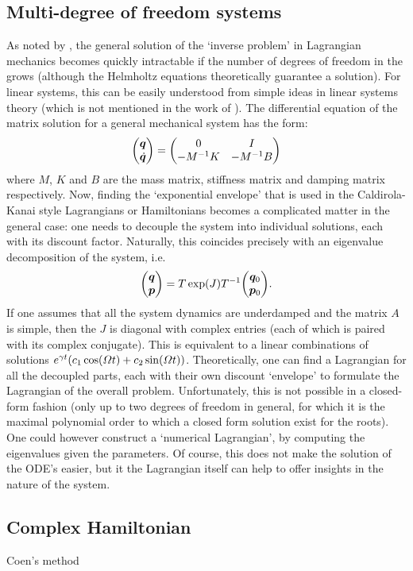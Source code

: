 \subsection{Multi-degree of freedom systems}
As noted by \citet{Udwadia2013}, the general solution of the `inverse problem' in Lagrangian mechanics becomes quickly intractable if the number of degrees of freedom in the grows (although the Helmholtz equations theoretically guarantee a solution). For linear systems, this can be easily understood from simple ideas in linear systems theory (which is not mentioned in the work of \citet{Udwadia2013}). The differential equation of the matrix solution for a general mechanical system has the form:
$$ \mqty(\vec{q}\\\vec{\dot{q}}) = \mqty(0 & I \\ -M^{-1}K & -M^{-1}B) $$
where $M$, $K$ and $B$ are the mass matrix, stiffness matrix and damping matrix respectively. Now, finding the `exponential envelope' that is used in the Caldirola-Kanai style Lagrangians or Hamiltonians becomes a complicated matter in the general case: one needs to decouple the system into individual solutions, each with its discount factor. Naturally, this coincides precisely with an eigenvalue decomposition of the system, i.e.
$$ \mqty(\vec{q}\\\vec{p}) = T\exp(J)T^{-1}\mqty(\vec{q}_0\\\vec{p}_0). $$
If one assumes that all the system dynamics are underdamped and the matrix $A$ is simple, then the $J$ is diagonal with complex entries (each of which is paired with its complex conjugate). This is equivalent to a linear combinations of solutions $e^{\gamma t}\qty(c_1\cos(\Omega t) + c_2\sin(\Omega t))$. Theoretically, one can find a Lagrangian for all the decoupled parts, each with their own discount `envelope' to formulate the Lagrangian of the overall problem. Unfortunately, this is not possible in a closed-form fashion (only up to two degrees of freedom in general, for which it is the maximal polynomial order to which a closed form solution exist for the roots). One could however construct a `numerical Lagrangian', by computing the eigenvalues given the parameters. Of course, this does not make the solution of the ODE's easier, but it the Lagrangian itself can help to offer insights in the nature of the system.

\subsection{Complex Hamiltonian}
Coen's method
